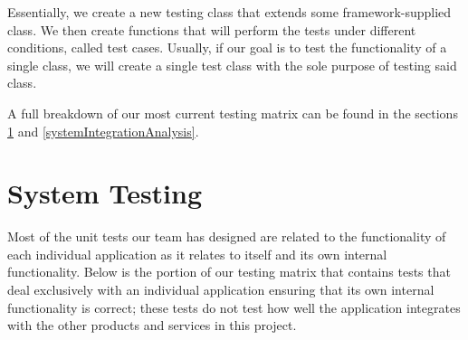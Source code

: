 Essentially, we create a new testing class that extends some framework-supplied
class. We then create functions that will perform the tests under different
conditions, called test cases. Usually, if our goal is to test the functionality
of a single class, we will create a single test class with the sole purpose of
testing said class.

A full breakdown of our most current testing matrix can be found in the
sections \ref{systemTesting} and \ref{systemIntegrationAnalysis}.


\section{System Testing} \label{systemTesting}

Most of the unit tests our team has designed are related to the functionality of
each individual application as it relates to itself and its own internal
functionality. Below is the portion of our testing matrix that contains tests
that deal exclusively with an individual application ensuring that its own
internal functionality is correct; these tests do not test how well the
application integrates with the other products and services in this project.

